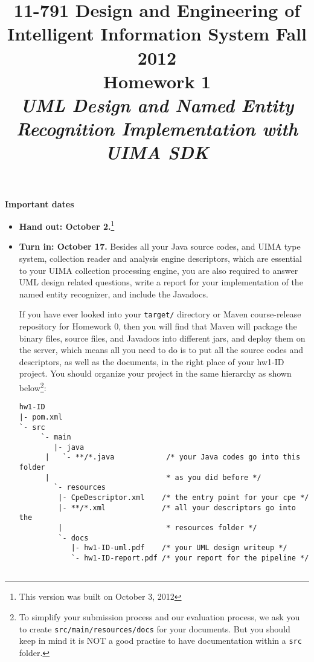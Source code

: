\documentclass[oneside]{memoir}
\title{{\bfseries 11-791 Design and Engineering of Intelligent Information
System Fall 2012\\Homework 1}\\
\vspace{1em}
\itshape\rmfamily UML Design and Named Entity Recognition Implementation with
UIMA SDK}
\date{}
\begin{document}
\begin{titlingpage}
\maketitle

\hspace{-0.1\textwidth}
\begin{minipage}{1.2\textwidth}
\vspace{-5em}
\textbf{Important dates}
\begin{itemize}

\item \textbf{Hand out: October 2.}\footnote{This version was built on October
3, 2012}

\item \textbf{Turn in: October 17.} Besides all your Java source codes, and UIMA
type system, collection reader and analysis engine descriptors, which are
essential to your UIMA collection processing engine, you are also required to
answer UML design related questions, write a report for your implementation of
the named entity recognizer, and include the Javadocs.

If you have ever looked into your \verb|target/| directory or Maven
course-release repository for Homework 0, then you will find that Maven will
package the binary files, source files, and Javadocs into different jars, and
deploy them on the server, which means all you need to do is to put all the
source codes and descriptors, as well as the documents, in the right place of
your hw1-ID project. You should organize your project in the same hierarchy as
shown below\footnote{To simplify your submission process and our evaluation
process, we ask you to create \texttt{src/main/resources/docs} for your
documents. But you should keep in mind it is NOT a good practise to have
documentation within a \texttt{src} folder.}:

\small
\begin{verbatim}
hw1-ID
|- pom.xml
`- src
     `- main
        |- java
      |   `- **/*.java            /* your Java codes go into this folder 
      |                           * as you did before */
        `- resources
         |- CpeDescriptor.xml    /* the entry point for your cpe */
         |- **/*.xml             /* all your descriptors go into the 
         |                        * resources folder */
         `- docs
            |- hw1-ID-uml.pdf    /* your UML design writeup */
            `- hw1-ID-report.pdf /* your report for the pipeline */


\end{verbatim}
\end{itemize}
\end{minipage}
\end{titlingpage}
\end{document}
